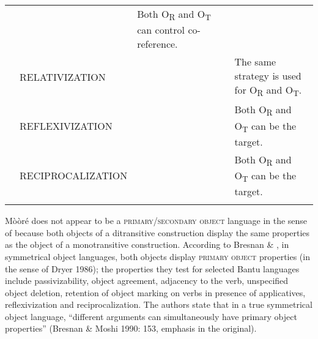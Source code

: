 \documentclass[output=paper]{langsci/langscibook}
\begin{document}
{{{{{{{\begin{tabular}{lllll}
\end{itemize} & 
\end{itemize} & Both O\textsubscript{R }and O\textsubscript{T} can control co-reference.\\
\hhline{~----} & RELATIVIZATION & 
\end{itemize} & 
\end{itemize} & The same strategy is used for O\textsubscript{R} and O\textsubscript{T}.\\
\hhline{~----} & REFLEXIVIZATION & 
\end{itemize} & 
\end{itemize} & Both O\textsubscript{R }and O\textsubscript{T }can be the target.\\
\hhline{~----} & RECIPROCALIZATION & 
\end{itemize} & 
\end{itemize} & Both O\textsubscript{R }and O\textsubscript{T }can be the target.\\
\hhline{~----}
\lspbottomrule
\end{tabular}
M\`{o}\`{o}r\'{e} does not appear to be a \textsc{primary}/\textsc{secondary object }language in the sense of \citet{Dryer1986} because both objects of a ditransitive construction display the same properties as the object of a monotransitive construction.{ }According to Bresnan \& \citet[147]{Moshi1991}, in symmetrical object languages, both objects display \textsc{primary object} properties (in the sense of Dryer 1986); the properties they test for selected Bantu languages include passivizability, object agreement, adjacency to the verb, unspecified object deletion, retention of object marking on verbs in presence of applicatives, reflexivization and reciprocalization. The authors state that in a true symmetrical object language, “different arguments can simultaneously have primary object properties” (Bresnan \& Moshi 1990: 153, emphasis in the original).

}}}}}}}
\end{document}
